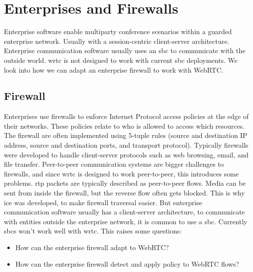 \section{Enterprises and Firewalls}
Enterprise software enable multiparty conference scenarios within a guarded enterprise network. Usually with a session-centric client-server architecture. Enterprise communication software usually uses an \gls{sbc} to communicate with the outside world. \gls{wrtc} is not designed to work with current \gls{sbc} deployments. We look into how we can adapt an enterprise firewall to work with WebRTC.


\subsection{Firewall}
Enterprises use firewalls to enforce Internet Protocol access policies at the edge of their networks. These policies relate to who is allowed to access which resources. The firewall are often implemented using 5-tuple rules (source and destination IP address, source and destination ports, and transport protocol). Typically firewalls were developed to handle client-server protocols such as web browsing, email, and file transfer\cite{johnston_taking_2013}. Peer-to-peer communication systems are bigger challenges to firewalls, and since \gls{wrtc} is designed to work peer-to-peer, this introduces some problems. \gls{rtp} packets are typically described as peer-to-peer flows. Media can be sent from inside the firewall, but the reverse flow often gets blocked. This is why \gls{ice} was developed, to make firewall traversal easier. But enterprise communication software usually has a client-server architecture, to communicate with entities outside the enterprise network, it is common to use a \gls{sbc}. Currently \gls{sbc}s won't work well with \gls{wrtc}. This raises some questions:

\begin{itemize}
\item How can the enterprise firewall adapt to WebRTC?
\item How can the enterprise firewall detect and apply policy to WebRTC flows?
\end{itemize}

